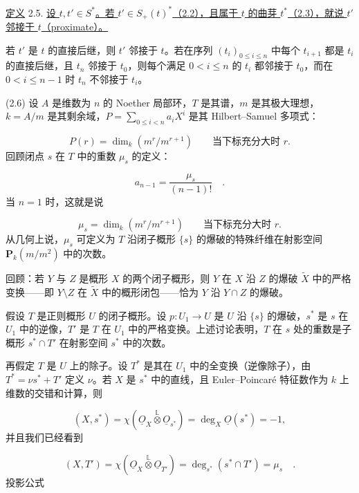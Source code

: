 \underline{定义} 2.5. \underline{设 $t,t'\in S^*$。若 $t'\in S_+(t)^*$（2.2），且属于 $t$ 的曲芽 $t^*$（2.3），就说 $t'$ 邻接于 $t$（proximate）。}

若 $t'$ 是 $t$ 的直接后继，则 $t'$ 邻接于 $t$。若在序列 $(t_i)_{0\leq i\leq n}$ 中每个 $t_{i+1}$ 都是 $t_i$ 的直接后继，且 $t_n$ 邻接于 $t_0$，则每个满足 $0<i\leq n$ 的 $t_i$ 都邻接于 $t_0$，而在 $0<i\leq n-1$ 时 $t_n$ 不邻接于 $t_i$。

(2.6) 设 $A$ 是维数为 $n$ 的 Noether 局部环，$T$ 是其谱，$m$ 是其极大理想，$k=A/m$ 是其剩余域，$P=\sum_{0\leq i<n}a_iX^i$ 是其 Hilbert--Samuel 多项式：

\begin{equation*}
P(r)=\dim_k(m^r/m^{r+1})\qquad\text{当下标充分大时 }r.
\end{equation*}
回顾闭点 $s$ 在 $T$ 中的重数 $\mu_s$ 的定义：

\begin{equation*}
a_{n-1}=\frac{\mu_s}{(n-1)!} \quad .
\end{equation*}
当 $n=1$ 时，这就是说

\begin{equation*}
\mu_s=\dim_k(m^r/m^{r+1})\qquad\text{当下标充分大时 }r.
\end{equation*}
从几何上说，$\mu_s$ 可定义为 $T$ 沿闭子概形 $\{s\}$ 的爆破的特殊纤维在射影空间 $\mathbf P_k(m/m^2)$ 中的次数。


回顾：若 $Y$ 与 $Z$ 是概形 $X$ 的两个闭子概形，则 $Y$ 在 $X$ 沿 $Z$ 的爆破 $\widetilde X$ 中的严格变换——即 $Y\setminus Z$ 在 $\widetilde X$ 中的概形闭包——恰为 $Y$ 沿 $Y\cap Z$ 的爆破。

假设 $T$ 是正则概形 $U$ 的闭子概形。设 $p:U_1\longrightarrow U$ 是 $U$ 沿 $\{s\}$ 的爆破，$s^*$ 是 $s$ 在 $U_1$ 中的逆像，$T'$ 是 $T$ 在 $U_1$ 中的严格变换。上述讨论表明，$T$ 在 $s$ 处的重数是子概形 $s^*\cap T'$ 在射影空间 $s^*$ 中的次数。

再假定 $T$ 是 $U$ 上的除子。设 $T^*$ 是其在 $U_1$ 中的全变换（逆像除子），由 $T^*=\nu s^*+T'$ 定义 $\nu$。若 $X$ 是 $s^*$ 中的直线，且 Euler--Poincaré 特征数作为 $k$ 上维数的交错和计算，则

\begin{equation}\tag{2.6.1}
(X,s^*)=
\chi(\underline{O}_X\overset{\mathbb L}{\otimes}\underline{O}_{s^*})
=\deg_X\underline{O}(s^*)=-1,
\end{equation}
并且我们已经看到

\begin{equation}\tag{2.6.2}
(X,T')=
\chi(\underline{O}_X\overset{\mathbb L}{\otimes}\underline{O}_{T'})
=\deg_{s^*}(s^*\cap T')=\mu_s \quad .
\end{equation}
投影公式

